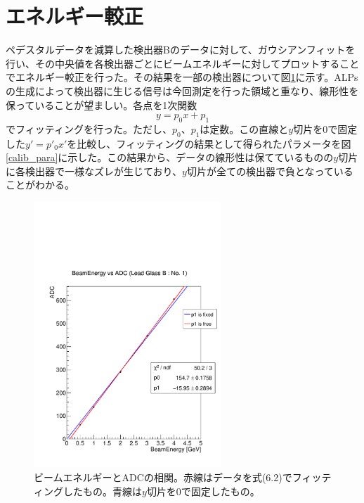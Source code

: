 \section{エネルギー較正}
ペデスタルデータを減算した検出器Bのデータに対して、ガウシアンフィットを行い、その中央値を各検出器ごとにビームエネルギーに対してプロットすることでエネルギー較正を行った。その結果を一部の検出器について図\ref{calib}に示す。ALPsの生成によって検出器に生じる信号は今回測定を行った領域と重なり、線形性を保っていることが望ましい。各点を1次関数
\begin{equation}
y = p_0x+p_1
\end{equation}
でフィッティングを行った。ただし、$p_0$、$p_1$は定数。この直線と$y$切片を$0$で固定した$y'=p'_0x'$を比較し、フィッティングの結果として得られたパラメータを図\ref{calib_para}に示した。この結果から、データの線形性は保てているものの$y$切片に各検出器で一様なズレが生じており、$y$切片が全ての検出器で負となっていることがわかる。

\begin{figure}[H]
	\begin{center}
		\includegraphics[width=200pt]{./Figure/EBESAnalysis/calib.pdf}
		\caption[ビームエネルギーとADCの相関]{ビームエネルギーとADCの相関。赤線はデータを式(6.2)でフィッティングしたもの。青線は$y$切片を0で固定したもの。}
		\label{calib}
	\end{center}
\end{figure}

